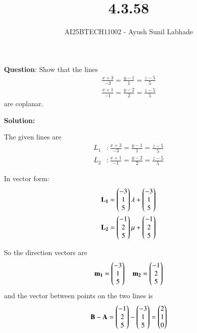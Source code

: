 \documentclass[journal,12pt,onecolumn]{IEEEtran}
\begin{document}
\title{4.3.58}
\author{AI25BTECH11002 - Ayush Sunil Labhade}
{\let\newpage\relax\maketitle}

\textbf{Question}:
		Show that the lines
		\begin{align}
\frac{x+3}{-3}=\frac{y-1}{1}=\frac{z-5}{5}
		\end{align}
		\begin{align}
		\frac{x+1}{-1}=\frac{y-2}{2}=\frac{z-5}{5}
		\end{align}
are coplanar.
	


\textbf{Solution:}

The given lines are
\begin{align}
L_1 &: \frac{x+3}{-3}=\frac{y-1}{1}=\frac{z-5}{5} \\
L_2 &: \frac{x+1}{-1}=\frac{y-2}{2}=\frac{z-5}{5}
\end{align}

In vector form:
\begin{align}
\mathbf{L_1} &= \begin{pmatrix}-3 \\ 1 \\ 5\end{pmatrix}\lambda + \begin{pmatrix}-3 \\ 1 \\ 5\end{pmatrix} \\
\mathbf{L_2} &= \begin{pmatrix}-1 \\ 2 \\ 5\end{pmatrix}\mu + \begin{pmatrix}-1 \\ 2 \\ 5\end{pmatrix}
\end{align}

So the direction vectors are
\begin{align}
\mathbf{m_1} = \begin{pmatrix}-3 \\ 1 \\ 5\end{pmatrix} \quad 
\mathbf{m_2} = \begin{pmatrix}-1 \\ 2 \\ 5\end{pmatrix}
\end{align}
and the vector between points on the two lines is
\begin{align}
\mathbf{B}-\mathbf{A} = \begin{pmatrix}-1 \\ 2 \\ 5\end{pmatrix} - \begin{pmatrix}-3 \\ 1 \\ 5\end{pmatrix} = \begin{pmatrix}2 \\ 1 \\ 0\end{pmatrix}
\end{align}
\end{document}
